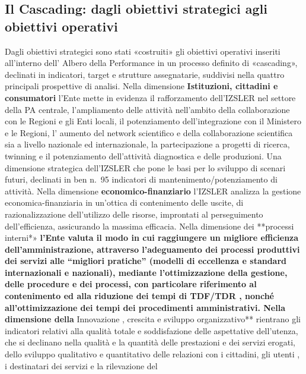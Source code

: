 \documentclass[
  12pt,
]{article}
\begin{document}
\hypertarget{il-cascading-dagli-obiettivi-strategici-agli-obiettivi-operativi}{%
\subsection{Il Cascading: dagli obiettivi strategici agli obiettivi
operativi}\label{il-cascading-dagli-obiettivi-strategici-agli-obiettivi-operativi}}

Dagli obiettivi strategici sono stati «costruiti» gli obiettivi
operativi inseriti all'interno dell' Albero della Performance in un
processo definito di «cascading», declinati in indicatori, target e
strutture assegnatarie, suddivisi nella quattro principali prospettive
di analisi. Nella dimensione \textbf{Istituzioni, cittadini e
consumatori} l'Ente mette in evidenza il rafforzamento dell'IZSLER nel
settore della PA centrale, l'ampliamento delle attività nell'ambito
della collaborazione con le Regioni e gli Enti locali, il potenziamento
dell'integrazione con il Ministero e le Regioni, l' aumento del network
scientifico e della collaborazione scientifica sia a livello nazionale
ed internazionale, la partecipazione a progetti di ricerca, twinning e
il potenziamento dell'attività diagnostica e delle produzioni. Una
dimensione strategica dell'IZSLER che pone le basi per lo sviluppo di
scenari futuri, declinati in ben n.~95 indicatori di
mantenimento/potenziamento di attività. Nella dimensione
\textbf{economico-finanziario} l'IZSLER analizza la gestione
economica-finanziaria in un'ottica di contenimento delle uscite, di
razionalizzazione dell'utilizzo delle risorse, improntati al
perseguimento dell'efficienza, assicurando la massima efficacia. Nella
dimensione dei **processi interni*»\textbf{ l'Ente valuta il modo in cui
raggiungere un migliore efficienza dell'amministrazione, attraverso
l'adeguamento dei processi produttivi dei servizi alle ``migliori
pratiche'' (modelli di eccellenza e standard internazionali e
nazionali), mediante l'ottimizzazione della gestione, delle procedure e
dei processi, con particolare riferimento al contenimento ed alla
riduzione dei tempi di TDF/TDR , nonché all'ottimizzazione dei tempi dei
procedimenti amministrativi. Nella dimensione della }Innovazione ,
crescita e sviluppo organizzativo** rientrano gli indicatori relativi
alla qualità totale e soddisfazione delle aspettative dell'utenza, che
si declinano nella qualità e la quantità delle prestazioni e dei servizi
erogati, dello sviluppo qualitativo e quantitativo delle relazioni con i
cittadini, gli utenti , i destinatari dei servizi e la rilevazione del
\end{document}
